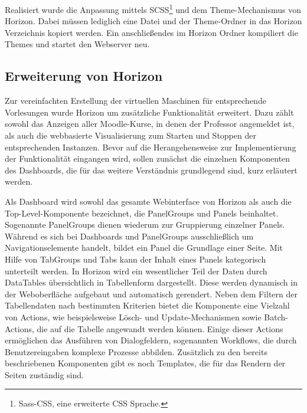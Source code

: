Realisiert wurde die Anpassung mittels SCSS\footnote{Sass-CSS, eine erweiterte CSS Sprache.} und dem Theme-Mechanismus von Horizon.
Dabei müssen lediglich eine Datei und der  Theme-Ordner in das Horizon Verzeichnis kopiert werden.
Ein anschließendes  im Horizon Ordner kompiliert die Themes und startet den Webserver neu.

\subsection{Erweiterung von Horizon}
Zur vereinfachten Erstellung der virtuellen Maschinen für entsprechende Vorlesungen wurde Horizon um zusätzliche Funktionalität erweitert. Dazu zählt sowohl das Anzeigen aller Moodle-Kurse, in denen der Professor angemeldet ist, als auch die webbasierte Visualisierung zum Starten und Stoppen der entsprechenden Instanzen. Bevor auf die Herangehensweise zur Implementierung der Funktionalität eingangen wird, sollen zunächst die einzelnen Komponenten des Dashboards, die für das weitere Verständnis grundlegend sind, kurz erläutert werden. 

Als Dashboard wird sowohl das gesamte Webinterface von Horizon als auch die Top-Level-Komponente bezeichnet, die PanelGroups und Panels beinhaltet. Sogenannte PanelGroups dienen wiederum zur Gruppierung einzelner Panels. Während es sich bei Dashboards und PanelGroups ausschließlich um Navigationselemente handelt, bildet ein Panel die Grundlage einer Seite. Mit Hilfe von TabGroups und Tabs kann der Inhalt eines Panels kategorisch unterteilt werden. In Horizon wird ein wesentlicher Teil der Daten durch DataTables übersichtlich in Tabellenform dargestellt. Diese werden dynamisch in der Weboberfläche aufgebaut und automatisch gerendert. Neben dem Filtern der Tabellendaten nach bestimmten Kriterien bietet die Komponente eine Vielzahl von Actions, wie beispielsweise Lösch- und Update-Mechanismen sowie Batch-Actions, die auf die Tabelle angewandt werden können. Einige dieser Actions ermöglichen das Ausführen von Dialogfeldern, sogenannten Workflows, die durch Benutzereingaben komplexe Prozesse abbilden. Zusätzlich zu den bereits beschriebenen Komponenten gibt es noch Templates, die für das Rendern der Seiten zuständig sind.

